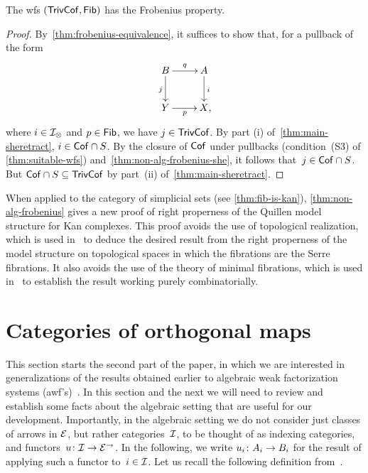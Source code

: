 \documentclass[reqno,10pt,a4paper,oneside,draft]{amsart}
\begin{document}
{{\begin{theorem} \label{thm:non-alg-frobenius}
The wfs $(\TrivCof, \Fib)$ has the Frobenius property.
\end{theorem}

\begin{proof}
By~\cref{thm:frobenius-equivalence}, it suffices to show that, for a pullback of the form
\begin{equation*}
\begin{gathered}
\xymatrix{
 B \ar[d]_j \ar[r]^q & A \ar[d]^i \\
Y \ar[r]_p & X \rlap{,}}
\end{gathered}
\end{equation*}
where $i \in \cal{I}_\otimes$ and $p \in \Fib$, we have $j \in \TrivCof$.
By part (i) of~\cref{thm:main-sheretract}, $i \in \Cof \cap S$.
By the closure of $\Cof$ under pullbacks (condition~(S3) of \cref{thm:suitable-wfs}) and~\cref{thm:non-alg-frobenius-she}, it follows that~$j \in \Cof \cap S$.
But $\Cof \cap S \subseteq \TrivCof$ by part~(ii) of~\cref{thm:main-sheretract}.
\end{proof}

\begin{example}
When applied to the category of simplicial sets (see \cref{thm:fib-is-kan}), \cref{thm:non-alg-frobenius} gives a new proof of right properness of the Quillen model structure for Kan complexes.
This proof avoids the use of topological realization, which is used in~\cite[Theorem~13.1.13]{hirschhorn-model-localizations} to deduce the desired result from the right properness of the model structure on topological spaces in which the fibrations are the Serre fibrations.
It also avoids the use of the theory of minimal fibrations, which is used in~\cite[Theorem~1.7.1]{joyal-tierney-notes} to establish the result working purely combinatorially.
\end{example}

\section{Categories of orthogonal maps}
\label{sec:ortf}

This section starts the second part of the paper, in which we are interested in generalizations of the results obtained earlier
to algebraic weak factorization systems (awf's)~\cite{garner:small-object-argument,grandis-tholen-nwfs}.
In this section and the next we will need to review and establish some facts about the algebraic setting that are useful for our development.
Importantly, in the algebraic setting we do not consider just classes of arrows in $\catE$, but rather categories~$\cal{I}$, to be thought of as indexing categories, and functors~$u \co \cal{I} \to \catE^\to$.
In the following, we write $u_i \co A_i \to B_i$ for the result of applying such a functor to~$i \in \cal{I}$.
Let us recall the following definition from~\cite{garner:small-object-argument}.

}}
\end{document}
